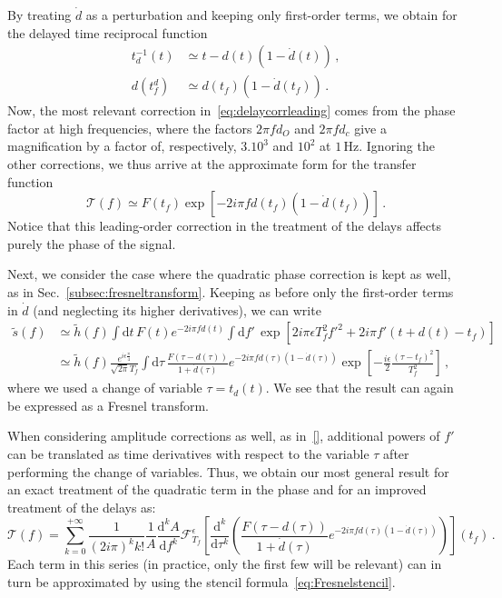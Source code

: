 \documentclass[aps,showpacs,%
prd,superscriptaddress,nofootinbib]{revtex4}
\newcommand{\be}{\begin{equation}}
\newcommand{\ee}{\end{equation}}
\newcommand\ud{{\mathrm{d}}}
\newcommand\calF{{\mathcal{F}}}
\newcommand\calT{{\mathcal{T}}}
\newcommand{\nn}{\nonumber}
\newcommand{\Hz}{\,\mathrm{Hz}}
\newcommand{\tf}{t_{f}}
\newcommand{\Tf}{T_{f}}
\begin{document}
By treating $\dot{d}$ as a perturbation and keeping only first-order terms, we obtain for the delayed time reciprocal function
\begin{align}
	t_{d}^{-1}(t) &\simeq t-d(t) (1-\dot{d}(t)) \,,\nn\\
	d(t_{f}^{d}) &\simeq d(t_{f}) ( 1 - \dot{d}(t_{f})) \,.
\end{align}
Now, the most relevant correction in~\eqref{eq:delaycorrleading} comes from the phase factor at high frequencies, where the factors $2\pi f d_{O}$ and $2\pi f d_{c}$ give a magnification by a factor of, respectively, $3.10^{3}$ and $10^{2}$ at $1\Hz$. Ignoring the other corrections, we thus arrive at the approximate form for the transfer function
\be
	\calT(f) \simeq F(t_{f})\exp\left[ -2i\pi f d(t_{f}) (1-\dot{d}(t_{f})) \right] \,.
\ee
Notice that this leading-order correction in the treatment of the delays affects purely the phase of the signal.

Next, we consider the case where the quadratic phase correction is kept as well, as in Sec.~\ref{subsec:fresneltransform}. Keeping as before only the first-order terms in $\dot{d}$ (and neglecting its higher derivatives), we can write
\begin{align}
	\tilde{s}(f) &\simeq \tilde{h}(f) \int \ud t \, F(t) e^{-2i\pi f d(t)} \int \ud f' \, \exp\left[ 2i\pi \epsilon \Tf^{2} f'^{2} + 2i\pi f' (t+d(t) - \tf) \right] \nn\\
	&\simeq \tilde{h}(f) \frac{e^{i\epsilon\frac{\pi}{4}}}{\sqrt{2\pi}\Tf} \int \ud \tau \, \frac{F(\tau - d(\tau))}{1+\dot{d}(\tau)} e^{-2i\pi f d(\tau)(1-\dot{d}(\tau))}\exp\left[ -\frac{i\epsilon}{2} \frac{(\tau - \tf)^{2}}{\Tf^{2}} \right] \,,
\end{align}
where we used a change of variable $\tau = t_{d}(t)$. We see that the result can again be expressed as a Fresnel transform.

When considering amplitude corrections as well, as in~\eqref{}, additional powers of $f'$ can be translated as time derivatives with respect to the variable $\tau$ after performing the change of variables. Thus, we obtain our most general result for an exact treatment of the quadratic term in the phase and for an improved treatment of the delays as:
\be
	\calT(f) = \sum\limits_{k=0}^{+\infty} \frac{1}{(2i\pi)^{k} k!} \frac{1}{A} \frac{\ud^{k}A}{\ud f^{k}}  \calF^{\epsilon}_{\Tf} \left[ \frac{\ud^{k}}{\ud \tau^{k}} \left( \frac{F(\tau - d(\tau))}{1+\dot{d}(\tau)} e^{-2i\pi f d(\tau)(1-\dot{d}(\tau))} \right) \right] (\tf) \,.
\ee
Each term in this series (in practice, only the first few will be relevant) can in turn be approximated by using the stencil formula~\eqref{eq:Fresnelstencil}.
\end{document}
